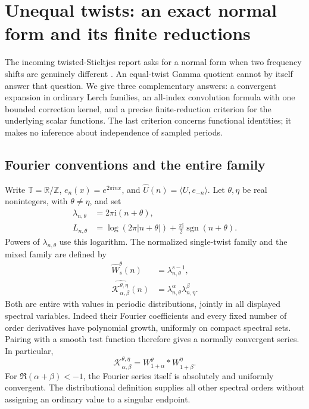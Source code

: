 \documentclass[11pt,a4paper]{article}
\numberwithin{equation}{section}
\theoremstyle{definition}
\theoremstyle{remark}
\DeclareMathOperator{\sgn}{sgn}
\newcommand{\Z}{\mathbb Z}
\newcommand{\R}{\mathbb R}
\newcommand{\T}{\mathbb T}
\newcommand{\ii}{\mathrm i}
\begin{document}
\clearpage
\section{Unequal twists: an exact normal form and its finite reductions}
\label{tw:sec}

The incoming twisted-Stieltjes report asks for a normal form when two
frequency shifts are genuinely different
\cite[research question on unequal twists]{RepoTwisted}.
An equal-twist Gamma quotient cannot by itself answer that question.
We give three complementary answers: a convergent expansion in ordinary
Lerch families, an all-index convolution formula with one bounded
correction kernel, and a precise finite-reduction criterion for the
underlying scalar functions. The last criterion concerns functional
identities; it makes no inference about independence of sampled periods.

\subsection{Fourier conventions and the entire family}

Write $\T=\R/\Z$, $e_n(x)=e^{2\pi\ii nx}$, and
$\widehat U(n)=\langle U,e_{-n}\rangle$. Let $\theta,\eta$ be real
nonintegers, with $\theta\ne\eta$, and set
\begin{align}
 \lambda_{n,\theta}&=2\pi\ii(n+\theta),\\
 L_{n,\theta}&=\log(2\pi|n+\theta|)
                +\frac{\pi\ii}{2}\sgn(n+\theta).
 \label{tw:log}
\end{align}
Powers of $\lambda_{n,\theta}$ use this logarithm. The normalized
single-twist family and the mixed family are defined by
\begin{align}
 \widehat W_s^\theta(n)&=\lambda_{n,\theta}^{s-1},\label{tw:W}\\
 \widehat{\mathcal K_{\alpha,\beta}^{\theta,\eta}}(n)
   &=\lambda_{n,\theta}^{\alpha}\lambda_{n,\eta}^{\beta}.
 \label{tw:K}
\end{align}
Both are entire with values in periodic distributions, jointly in all
displayed spectral variables. Indeed their Fourier coefficients and every
fixed number of order derivatives have polynomial growth, uniformly on
compact spectral sets. Pairing with a smooth test function therefore gives
a normally convergent series. In particular,
\begin{equation}
 \mathcal K_{\alpha,\beta}^{\theta,\eta}
   =W_{1+\alpha}^{\theta}*W_{1+\beta}^{\eta}.
 \label{tw:Kconv}
\end{equation}
For $\Re(\alpha+\beta)<-1$, the Fourier series itself is absolutely
and uniformly convergent. The distributional definition supplies all
other spectral orders without assigning an ordinary value to a singular
endpoint.
\end{document}
